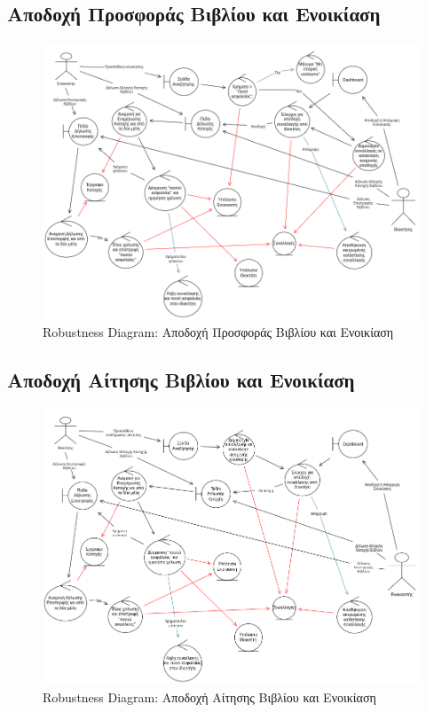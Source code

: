 \documentclass[12pt,a4paper]{article}
\begin{document}
\subsection{Αποδοχή Προσφοράς Βιβλίου και Ενοικίαση}
\begin{figure}[H]
	\includegraphics[width=\textwidth]{Accept Book Offer and Rent Robustness.png}
	\caption{Robustness Diagram: Αποδοχή Προσφοράς Βιβλίου και Ενοικίαση}
	\label{Robustness Diagram: Αποδοχή Προσφοράς Βιβλίου και Ενοικίαση}
\end{figure}

\subsection{Αποδοχή Αίτησης Βιβλίου και Ενοικίαση}
\begin{figure}[H]
	\includegraphics[width=\textwidth]{Accept Request Offer and Rent Robustness.png}
	\caption{Robustness Diagram: Αποδοχή Αίτησης Βιβλίου και Ενοικίαση}
	\label{Robustness Diagram: Αποδοχή Αίτησης Βιβλίου και Ενοικίαση}
\end{figure}
\end{document}
